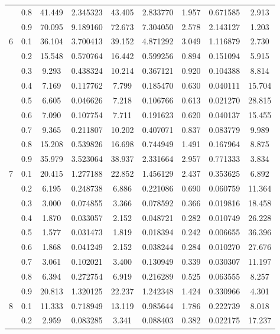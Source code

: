\begin{longtable}{ | c | c || c | c | c | c | c | c | c | }
 & 0.8 & 41.449 & 2.345323 & 43.405 & 2.833770 & 1.957 & 0.671585 & 2.913 \\
 & 0.9 & 70.095 & 9.189160 & 72.673 & 7.304050 & 2.578 & 2.143127 & 1.203 \\
 \hline
\multirow{9}{*}{6} & 0.1 & 36.104 & 3.700413 & 39.152 & 4.871292 & 3.049 & 1.116879 & 2.730 \\
 & 0.2 & 15.548 & 0.570764 & 16.442 & 0.599256 & 0.894 & 0.151094 & 5.915 \\
 & 0.3 & 9.293 & 0.438324 & 10.214 & 0.367121 & 0.920 & 0.104388 & 8.814 \\
 & 0.4 & 7.169 & 0.117762 & 7.799 & 0.185470 & 0.630 & 0.040111 & 15.704 \\
 & 0.5 & 6.605 & 0.046626 & 7.218 & 0.106766 & 0.613 & 0.021270 & 28.815 \\
 & 0.6 & 7.090 & 0.107754 & 7.711 & 0.191623 & 0.620 & 0.040137 & 15.455 \\
 & 0.7 & 9.365 & 0.211807 & 10.202 & 0.407071 & 0.837 & 0.083779 & 9.989 \\
 & 0.8 & 15.208 & 0.539826 & 16.698 & 0.744949 & 1.491 & 0.167964 & 8.875 \\
 & 0.9 & 35.979 & 3.523064 & 38.937 & 2.331664 & 2.957 & 0.771333 & 3.834 \\
 \hline
\multirow{9}{*}{7} & 0.1 & 20.415 & 1.277188 & 22.852 & 1.456129 & 2.437 & 0.353625 & 6.892 \\
 & 0.2 & 6.195 & 0.248738 & 6.886 & 0.221086 & 0.690 & 0.060759 & 11.364 \\
 & 0.3 & 3.000 & 0.074855 & 3.366 & 0.078592 & 0.366 & 0.019816 & 18.458 \\
 & 0.4 & 1.870 & 0.033057 & 2.152 & 0.048721 & 0.282 & 0.010749 & 26.228 \\
 & 0.5 & 1.577 & 0.031473 & 1.819 & 0.018394 & 0.242 & 0.006655 & 36.396 \\
 & 0.6 & 1.868 & 0.041249 & 2.152 & 0.038244 & 0.284 & 0.010270 & 27.676 \\
 & 0.7 & 3.061 & 0.102021 & 3.400 & 0.130949 & 0.339 & 0.030307 & 11.197 \\
 & 0.8 & 6.394 & 0.272754 & 6.919 & 0.216289 & 0.525 & 0.063555 & 8.257 \\
 & 0.9 & 20.813 & 1.320125 & 22.237 & 1.242348 & 1.424 & 0.330966 & 4.301 \\
 \hline
\multirow{9}{*}{8} & 0.1 & 11.333 & 0.718949 & 13.119 & 0.985644 & 1.786 & 0.222739 & 8.018 \\
 & 0.2 & 2.959 & 0.083285 & 3.341 & 0.088403 & 0.382 & 0.022175 & 17.237 \\

\end{longtable}
